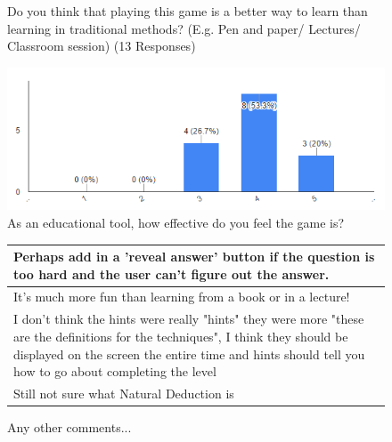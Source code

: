 \begin{figure}[H]
\caption{Do you think that playing this game is a better way to learn than learning in traditional methods? (E.g. Pen and paper/ Lectures/ Classroom session) (13 Responses)}
\end{figure}

\begin{figure}[H]
\includegraphics[scale=0.8]{education}
\caption{As an educational tool, how effective do you feel the game is?}
\end{figure}

\begin{figure}[H]
\begin{tabular}{|p{12cm}|} 
\hline
Perhaps add in a 'reveal answer' button if the question is too hard and the user can't figure out the answer. \\
\hline
It's much more fun than learning from a book or in a lecture! \\
\hline
I don't think the hints were really "hints" they were more "these are the definitions for the techniques", I think they should be displayed on the screen the entire time and hints should tell you how to go about completing the level \\
\hline
Still not sure what Natural Deduction is \\
\hline
\end{tabular}
\caption{Any other comments...}
\end{figure}
